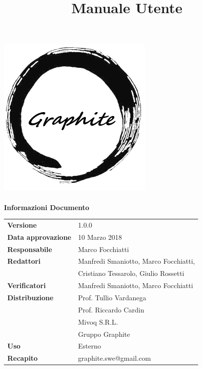 \documentclass[openany,12pt,a4paper]{report}
\title{Manuale Utente}
\author{}
\newcommand{\versione}{1.0.0}
\begin{document}
	\makeatletter
	\begin{titlepage}
		\setlength{\headsep}{0pt}  
		\begin{center}
			\includegraphics[width=0.5\linewidth]{img/logo.png}\\[1em]
			{\huge \bfseries  \@title }\\[10ex]
			\textbf{\Large Informazioni Documento} \\[2em]
			\bgroup
			\def\arraystretch{1.5}
			\begin{tabular}{l|l}
				\textbf{Versione} & \versione{} \\
				\textbf{Data approvazione} & 10 Marzo 2018 \\
				\textbf{Responsabile} & Marco Focchiatti\\
				\textbf{Redattori} &  Manfredi Smaniotto, Marco Focchiatti,\\
				& Cristiano Tessarolo, Giulio Rossetti \\
				\textbf{Verificatori} & Manfredi Smaniotto, Marco Focchiatti \\
				\textbf{Distribuzione} & Prof. Tullio Vardanega \\
				& Prof. Riccardo Cardin \\
				& Mivoq S.R.L. \\
				& Gruppo Graphite \\
				\textbf{Uso} & Esterno \\
				\textbf{Recapito} & graphite.swe@gmail.com \\
			\end{tabular}
			\egroup
		\end{center}
	\end{titlepage}
	\makeatother
	
	\thispagestyle{empty}
	\newpage
	
	
\end{document}
